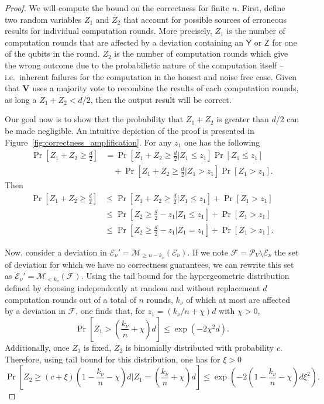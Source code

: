 \documentclass[12pt]{iopart}
\newcommand{\cptp}[1]{\mathsf{#1}} \newcommand{\pd}[1]{\mathcal{#1}}  \newcommand{\sch}[1]{\bm{#1}}
\newcommand{\Z}{\cptp{Z}}
\newcommand{\Y}{\cptp{Y}}
\renewcommand{\1}{\mathds{1}}
\begin{document}
\begin{proof}

We will compute the bound on the correctness for finite $n$. First, define
two random variables $Z_1$ and $Z_2$ that account for possible sources
of erroneous results for individual computation rounds. More
precisely, $Z_1$ is the number of computation rounds that are affected
by a deviation containing an $\Y$ or $\Z$ for one of the qubits in the
round. $Z_2$ is the number of computation rounds which give the wrong
outcome due to the probabilistic nature of the computation
itself -- i.e.~inherent failures for the computation in the honest and
noise free case. Given that $\sch V$ uses a majority vote to recombine
the results of each computation rounds, as long a $Z_1 + Z_2 < d/2$,
then the output result will be correct.

Our goal now is to show that the probability that $Z_1 + Z_2$ is
greater than $d/2$ can be made negligible. An intuitive depiction of the proof is presented in Figure~\ref{fig:correctness_amplification}. For any $z_1$ one has the
following
\begin{align}
\Pr[Z_1+Z_2 \geq \frac{d}{2}]
& = \Pr[Z_1+Z_2 \geq \frac{d}{2} | Z_1 \leq z_1] \Pr[Z_1 \leq z_1] \\
& \quad + \Pr[Z_1+Z_2 \geq \frac{d}{2} | Z_1 > z_1] \Pr[Z_1 > z_1].
\end{align}
Then
\begin{align}
\Pr[Z_1+Z_2 \geq \frac{d}{2}]& \leq \Pr[Z_1+Z_2 \geq \frac{d}{2} | Z_1 \leq z_1] + \Pr[Z_1 > z_1] \\
& \leq \Pr[Z_2 \geq \frac{d}{2} - z_1 | Z_1 \leq z_1] + \Pr[Z_1 > z_1] \\
& \leq \Pr[Z_2 \geq \frac{d}{2} - z_1 | Z_1 = z_1] + \Pr[Z_1 > z_1].
\end{align}

Now, consider a deviation in $\mathcal{E}_\nu' = \mathcal{M}_{\geq n - k_\nu}(\mathcal E_\nu)$.
If we note $\mathcal{F} = \mathcal{P}_V \setminus \mathcal E_\nu$ the set of deviation for
which we have no correctness guarantees, 
we can rewrite this set as $\mathcal{E}_\nu' = \mathcal{M}_{< k_\nu}(\mathcal F)$. Using the tail bound
for the hypergeometric distribution defined by choosing independently
at random and without replacement $d$ computation rounds out of a
total of $n$ rounds, $k_\nu$ of which at most are affected by a
deviation in $\mathcal{F}$, one finds that, for $z_1 = (k_\nu/n + \chi) d$ with
$\chi > 0$,
\begin{equation}
\Pr[Z_1 > \left(\frac{k_\nu}{n} + \chi\right) d] \leq \exp(-2\chi^2 d).
\end{equation}
Additionally, once $Z_1$ is fixed, $Z_2$ is binomially distributed
with probability $c$. Therefore, using tail bound for this
distribution, one has for $\xi > 0$
\begin{equation}
\Pr[Z_2 \geq (c + \xi)\left(1 - \frac{k_\nu}{n} - \chi\right) d | Z_1 = \left(\frac{k_\nu}{n}+\chi\right) d] \leq \exp(- 2\left(1-\frac{k_\nu}{n} - \chi\right)d \xi^2).
\end{equation}


\end{proof}
\end{document}
